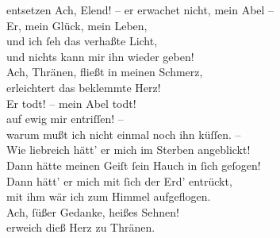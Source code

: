 \documentclass[tocstyle=ref-genre]{ees}
\begin{document}
{\begin{movement}{entsetzen}
  \voice[Thirza]
  Ach, Elend! – er erwachet nicht, mein Abel –\\
  Er, mein Glück, mein Leben,\\
  und ich ſeh das verhaßte Licht,\\
  und nichts kann mir ihn wieder geben!\\
  Ach, Thränen, fließt in meinen Schmerz,\\
  erleichtert das beklemmte Herz!\\
  Er todt! – mein Abel todt!\\
  auf ewig mir entriſſen! –\\
  warum mußt ich nicht einmal noch ihn küſſen. –\\
  Wie liebreich hätt’ er mich im Sterben angeblickt!\\
  Dann hätte meinen Geiſt ſein Hauch in ſich geſogen!\\
  Dann hätt’ er mich mit ſich der Erd’ entrückt,\\
  mit ihm wär ich zum Himmel aufgeflogen.\\
  Ach, ſüßer Gedanke, heißes Sehnen!\\
  erweich dieß Herz zu Thränen.
\end{movement}










}

\eesScore
\end{document}
